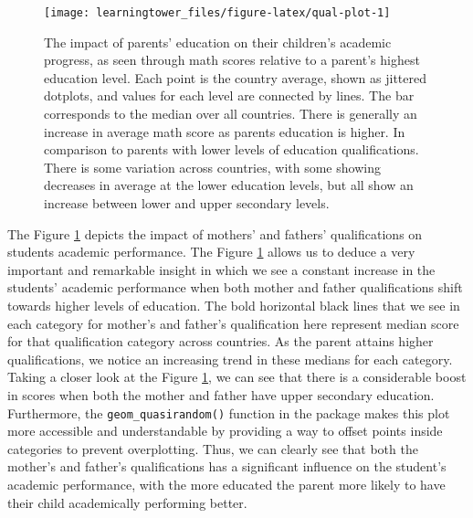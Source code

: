 \begin{figure}[H]
\texttt{[image: learningtower\_files/figure-latex/qual-plot-1]} \caption{The impact of parents' education on their children's academic progress, as seen through math scores relative to a parent's highest education level. Each point is the country average, shown as jittered dotplots, and values for each level are connected by lines. The bar corresponds to the median over all countries. There is generally an increase in average math score as parents education is higher. In comparison to parents with lower levels of education qualifications. There is some variation across countries, with some showing decreases in average at the lower education levels, but all show an increase between lower and upper secondary levels.}\label{fig:qual-plot}
\end{figure}

The Figure \ref{fig:qual-plot} depicts the impact of mothers' and fathers' qualifications on students academic performance. The Figure \ref{fig:qual-plot} allows us to deduce a very important and remarkable insight in which we see a constant increase in the students' academic performance when both mother and father qualifications shift towards higher levels of education. The bold horizontal black lines that we see in each category for mother's and father's qualification here represent median score for that qualification category across countries. As the parent attains higher qualifications, we notice an increasing trend in these medians for each category. Taking a closer look at the Figure \ref{fig:qual-plot}, we can see that there is a considerable boost in scores when both the mother and father have upper secondary education. Furthermore, the \texttt{geom\_quasirandom()} function in the  \citep{ggbeeswarm} package makes this plot more accessible and understandable by providing a way to offset points inside categories to prevent overplotting. Thus, we can clearly see that both the mother's and father's qualifications has a significant influence on the student's academic performance, with the more educated the parent more likely to have their child academically performing better.

